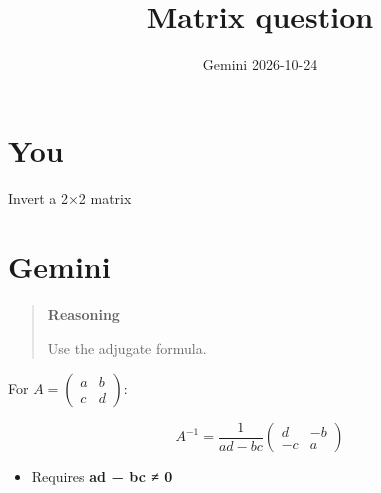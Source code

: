 \documentclass[11pt,a4paper]{article}
\title{Matrix question}
\date{Gemini \textperiodcentered{} 2026-10-24}
\begin{document}
\maketitle

\section*{You}

Invert a 2×2 matrix


\section*{Gemini}

\begin{quote}
\textbf{Reasoning}

Use the adjugate formula.

\end{quote}

For $A=\begin{pmatrix}a&b\\c&d\end{pmatrix}$:

\[
A^{-1}=\frac{1}{ad-bc}\begin{pmatrix}d&-b\\-c&a\end{pmatrix}
\]

\begin{itemize}
  \item Requires \textbf{ad − bc ≠ 0}
\end{itemize}
\end{document}
